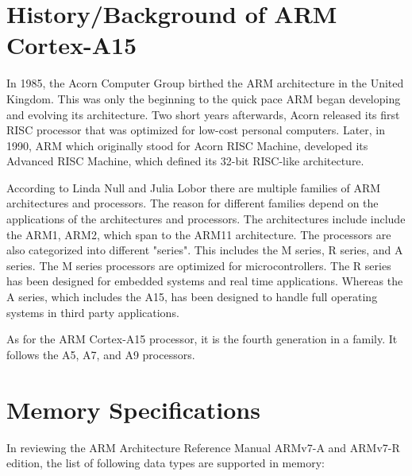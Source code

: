 \documentclass[12pt]{scrreprt}
\begin{document}
\tableofcontents



\chapter{History/Background of ARM Cortex-A15}

	In 1985, the Acorn Computer Group birthed the ARM architecture in the United Kingdom. This was only the beginning to
	the quick pace ARM began developing and evolving its architecture. Two short years afterwards, Acorn 
	released its first RISC processor that was optimized for low-cost personal computers. Later, in 1990, ARM 
	which originally stood for Acorn RISC Machine, developed its Advanced RISC Machine, which defined its 32-bit RISC-like
	architecture.

	According to Linda Null and Julia Lobor there are multiple families of ARM architectures and processors. The reason for different
	families depend on the applications of the architectures and processors. The architectures include include the ARM1, ARM2,
	which span to the ARM11 architecture. The processors are also categorized into different "series". This includes the
	M series, R series, and A series. The M series processors are optimized for microcontrollers. The R series has been designed
	for embedded systems and real time applications. Whereas the A series, which includes the A15, has been designed to handle
	full operating systems in third party applications.

	

	
	As for the ARM Cortex-A15 processor, it is the fourth generation in a family. It follows the A5, A7, and A9 processors.


{\let\clearpage\relax\chapter{Memory Specifications}}

	In reviewing the ARM Architecture Reference Manual ARMv7-A and ARMv7-R edition, the list of following data types are supported in memory:

\end{document}
